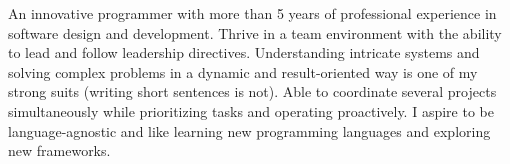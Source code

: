

\begin{cvparagraph}

An innovative programmer with more than 5 years of
 professional experience in software design and development.
Thrive in a team environment with the ability to lead and
 follow leadership directives.
Understanding intricate systems and solving complex problems 
in a dynamic and result-oriented way is one of my strong
 suits (writing short sentences is not).
Able to coordinate several projects simultaneously
 while prioritizing tasks and operating proactively.
I aspire to be language-agnostic and like learning
 new programming languages and exploring new frameworks.
\end{cvparagraph}
